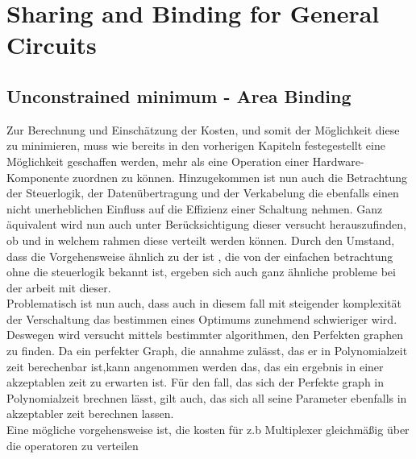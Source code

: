 \documentclass[conference]{IEEEtran}
\begin{document}
\section{Sharing and Binding for General Circuits}
\subsection{Unconstrained minimum - Area Binding}
Zur Berechnung und Einschätzung der Kosten, und somit der Möglichkeit diese zu minimieren, muss wie bereits in den vorherigen Kapiteln festegestellt eine Möglichkeit geschaffen werden, mehr als eine Operation einer Hardware-Komponente zuordnen zu können. Hinzugekommen ist nun auch die Betrachtung der Steuerlogik, der Datenübertragung und der Verkabelung die ebenfalls einen nicht unerheblichen Einfluss auf die Effizienz einer Schaltung nehmen. Ganz äquivalent wird nun auch unter Berücksichtigung dieser versucht herauszufinden, ob und in welchem rahmen diese verteilt werden können. Durch den Umstand, dass die Vorgehensweise ähnlich zu der ist , die von der einfachen betrachtung ohne die steuerlogik bekannt ist, ergeben sich auch ganz ähnliche probleme bei der arbeit mit dieser.\\
Problematisch ist nun auch, dass auch in diesem fall mit steigender komplexität der Verschaltung das bestimmen eines Optimums zunehmend schwieriger wird. Deswegen wird versucht mittels bestimmter algorithmen, den Perfekten graphen zu finden. 
Da ein perfekter Graph, die annahme zulässt, das er in Polynomialzeit zeit berechenbar ist,kann angenommen werden das, das ein ergebnis in einer akzeptablen zeit zu erwarten ist. Für den fall, das sich der Perfekte graph in Polynomialzeit brechnen lässt, gilt auch, das sich all seine Parameter ebenfalls in akzeptabler zeit berechnen lassen\cite[S. 60]{6}.\\
Eine mögliche vorgehensweise ist, die kosten für z.b Multiplexer gleichmäßig über die operatoren zu verteilen\cite[S.247]{3}
\end{document}
